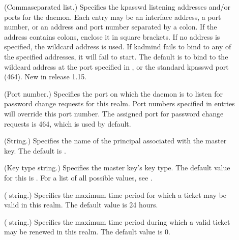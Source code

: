 \documentclass[letterpaper,10pt,english]{sphinxmanual}
\begin{document}
\begin{description}
\item[{}] \leavevmode
\sphinxAtStartPar
(Comma\sphinxhyphen{}separated list.)  Specifies the kpasswd listening addresses
and/or ports for the {\hyperref[\detokenize{admin/admin_commands/kadmind:kadmind-8}]{}} daemon.  Each entry may be
an interface address, a port number, or an address and port number
separated by a colon.  If the address contains colons, enclose it
in square brackets.  If no address is specified, the wildcard
address is used.  If kadmind fails to bind to any of the specified
addresses, it will fail to start.  The default is to bind to the
wildcard address at the port specified in , or the
standard kpasswd port (464).  New in release 1.15.

\item[{}] \leavevmode
\sphinxAtStartPar
(Port number.)  Specifies the port on which the {\hyperref[\detokenize{admin/admin_commands/kadmind:kadmind-8}]{}}
daemon is to listen for password change requests for this realm.
Port numbers specified in  entries will override
this port number.  The assigned port for password change requests
is 464, which is used by default.

\item[{}] \leavevmode
\sphinxAtStartPar
(String.)  Specifies the name of the principal associated with the
master key.  The default is .

\item[{}] \leavevmode
\sphinxAtStartPar
(Key type string.)  Specifies the master key’s key type.  The
default value for this is .  For a list of all possible
values, see {\hyperref[\detokenize{admin/conf_files/kdc_conf:encryption-types}]{}}.

\item[{}] \leavevmode
\sphinxAtStartPar
( string.)  Specifies the maximum time period for
which a ticket may be valid in this realm.  The default value is
24 hours.

\item[{}] \leavevmode
\sphinxAtStartPar
( string.)  Specifies the maximum time period
during which a valid ticket may be renewed in this realm.
The default value is 0.


\end{description}
\end{document}
